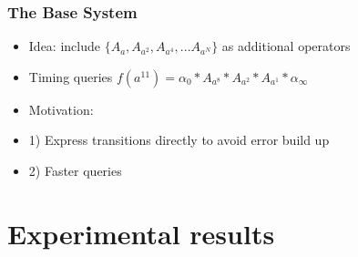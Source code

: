 \documentclass{beamer}
\begin{document}
\begin{frame}
\frametitle{The Base System}
\begin{itemize}

\item Idea: include $\{A_a, A_{a^2}, A_{a^4}, ... A_{a^N}\}$ as additional operators

\item Timing queries $f(a^{11}) = \alpha_0*A_{a^8}*A_{a^2}*A_{a^1}*\alpha_\infty$

\item Motivation: 
\item[] 1) Express transitions directly to avoid error build up
\item[] 2) Faster queries
\end{itemize}
\end{frame}

\section{Experimental results}
\end{document}
